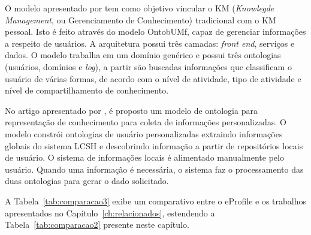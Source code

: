 O modelo apresentado por  tem como objetivo vincular o KM ({\it Knowlegde Management}, ou Gerenciamento de Conhecimento) tradicional com o KM pessoal. Isto é feito através do modelo OntobUMf, capaz de gerenciar informações a respeito de usuários. A arquitetura possui três camadas: {\it front end}, serviços e dados. O modelo trabalha em um domínio genérico e possui três ontologias (usuários, domínios e {\it log}), a partir são buscadas informações que classificam o usuário de várias formas, de acordo com o nível de atividade, tipo de atividade e nível de compartilhamento de conhecimento.

No artigo apresentado por , é proposto um modelo de ontologia para representação de conhecimento para coleta de informações personalizadas. O modelo constrói ontologias de usuário personalizadas extraindo informações globais do sistema LCSH e descobrindo informação a partir de repositórios locais de usuário. O sistema de informações locais é alimentado manualmente pelo usuário. Quando uma informação é necessária, o sistema faz o processamento das duas ontologias para gerar o dado solicitado.

A Tabela~\ref{tab:comparacao3} exibe um comparativo entre o eProfile e os trabalhos apresentados no Capítulo~\ref{ch:relacionados}, estendendo a Tabela~\ref{tab:comparacao2} presente neste capítulo.

